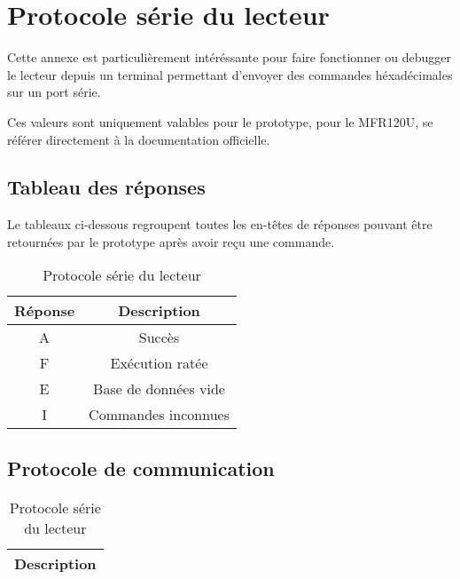\chapter{Protocole série du lecteur}

    Cette annexe est particulièrement intéréssante pour faire fonctionner ou debugger
le lecteur depuis un terminal permettant d'envoyer des commandes héxadécimales sur
un port série. 

    Ces valeurs sont uniquement valables pour le prototype, pour le MFR120U, se 
référer directement à la documentation officielle.

\section{Tableau des réponses}

    Le tableaux ci-dessous regroupent toutes les en-têtes de réponses pouvant être
retournées par le prototype après avoir reçu une commande.

\begin{table}[h]
\begin{center}

    \begin{tabular}{|c|c|}
    \hline
    Réponse & Description \\
    \hline
    A & Succès \\
    \hline
    F & Exécution ratée \\
    \hline
    E & Base de données vide\\
    \hline
    I & Commandes inconnues\\
    \hline
    \end{tabular}

\end{center}
\caption{Protocole série du lecteur}
\label{Protocole série du lecteur}
\end{table}






\section{Protocole de communication}

\begin{table}[h]
\begin{center}

    \begin{tabular}{|c|}
    \hline
    Description \\
    \hline
    \end{tabular}

\end{center}
\caption{Protocole série du lecteur}
\label{Protocole série du lecteur}
\end{table}

